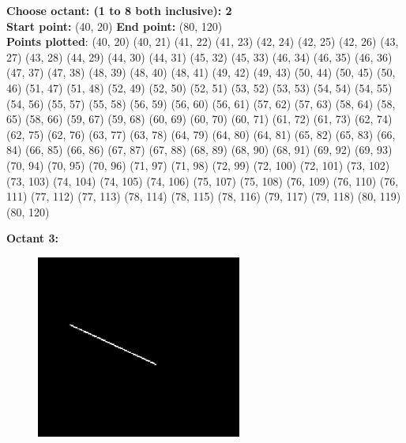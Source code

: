 \documentclass[12pt,letterpaper]{article}
\begin{document}
\textbf{Choose octant: (1 to 8 both inclusive): 2}\\
\textbf{Start point:} (40, 20)
\textbf{End point:} (80, 120)\\
\textbf{Points plotted}: 
(40, 20) (40, 21) (41, 22) (41, 23) 
(42, 24) (42, 25) (42, 26) (43, 27) 
(43, 28) (44, 29) (44, 30) (44, 31) 
(45, 32) (45, 33) (46, 34) (46, 35) 
(46, 36) (47, 37) (47, 38) (48, 39) 
(48, 40) (48, 41) (49, 42) (49, 43) 
(50, 44) (50, 45) (50, 46) (51, 47) 
(51, 48) (52, 49) (52, 50) (52, 51) 
(53, 52) (53, 53) (54, 54) (54, 55) 
(54, 56) (55, 57) (55, 58) (56, 59) 
(56, 60) (56, 61) (57, 62) (57, 63) 
(58, 64) (58, 65) (58, 66) (59, 67) 
(59, 68) (60, 69) (60, 70) (60, 71) 
(61, 72) (61, 73) (62, 74) (62, 75) 
(62, 76) (63, 77) (63, 78) (64, 79) 
(64, 80) (64, 81) (65, 82) (65, 83) 
(66, 84) (66, 85) (66, 86) (67, 87) 
(67, 88) (68, 89) (68, 90) (68, 91) 
(69, 92) (69, 93) (70, 94) (70, 95) 
(70, 96) (71, 97) (71, 98) (72, 99) 
(72, 100) (72, 101) (73, 102) (73, 103) 
(74, 104) (74, 105) (74, 106) (75, 107) 
(75, 108) (76, 109) (76, 110) (76, 111) 
(77, 112) (77, 113) (78, 114) (78, 115) 
(78, 116) (79, 117) (79, 118) (80, 119) 
(80, 120)

\newpage
\textbf{Octant 3:}
\begin{figure}[h]
    \centering
    \includegraphics[height=6cm]{Outputs/O3-1.png}
\end{figure}
\end{document}
